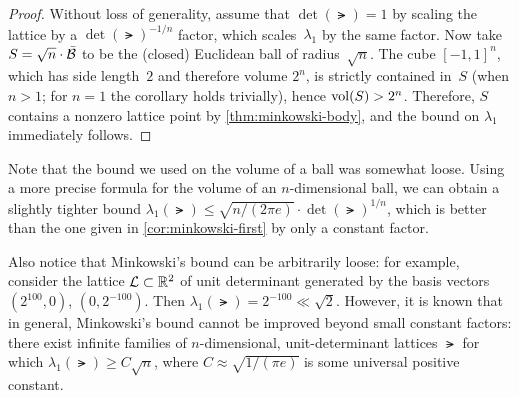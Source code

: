 \documentclass[11pt]{article}
\begin{document}
\begin{proof}
  Without loss of generality, assume that $\det(\lat) = 1$ by scaling
  the lattice by a $\det(\lat)^{-1/n}$ factor, which
  scales~$\lambda_{1}$ by the same factor. Now take
  $S = \sqrt{n} \cdot \bar{\mathcal{B}}$ to be the (closed) Euclidean ball
  of radius~$\sqrt{n}$. The cube $[-1,1]^{n}$, which has side
  length~$2$ and therefore volume $2^{n}$, is strictly contained
  in~$S$ (when $n > 1$; for $n=1$ the corollary holds trivially),
  hence $\operatorname{vol}(S) > 2^n$. Therefore, $S$ contains a nonzero lattice
  point by \cref{thm:minkowski-body}, and the bound on $\lambda_{1}$
  immediately follows.
\end{proof}

Note that the bound we used on the volume of a ball was somewhat
loose. Using a more precise formula for the volume of an
$n$-dimensional ball, we can obtain a slightly tighter bound
$\lambda_{1}(\lat) \leq \sqrt{n/(2 \pi e)} \cdot \det(\lat)^{1/n}$,
which is better than the one given in \cref{cor:minkowski-first} by
only a constant factor.

Also notice that Minkowski's bound can be arbitrarily loose: for
example, consider the lattice $\mathcal{L} \subset \mathbb{R}^{2}$ of unit
determinant generated by the basis vectors $(2^{100}, 0)$,
$(0,2^{-100})$.  Then $\lambda_{1}(\lat) = 2^{-100} \ll \sqrt{2}$.
However, it is known that in general, Minkowski's bound cannot be
improved beyond small constant factors: there exist infinite families
of $n$-dimensional, unit-determinant lattices $\lat$ for which
$\lambda_{1}(\lat) \geq C \sqrt{n}$, where $C \approx \sqrt{1/(\pi
  e)}$ is some universal positive constant.
\end{document}
